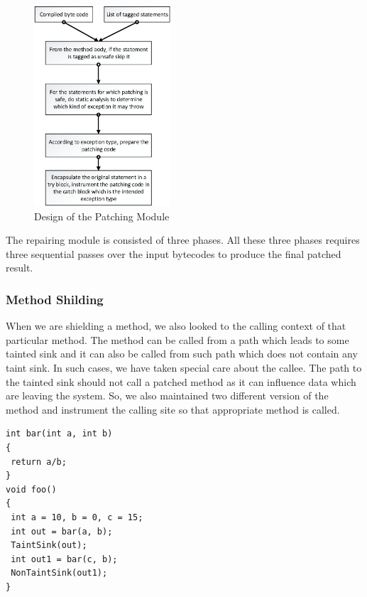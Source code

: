 \begin{figure}
\centering
  \includegraphics[width= 2.0in]{images/PatchModule.png}
  \caption{Design of the Patching Module}
  \label{fig:PatchModule}
\end{figure}

The repairing module is consisted of three phases. All these three phases
requires three sequential passes over the input bytecodes to produce the final
patched result.


\subsubsection{Method Shilding}
\label{MethodShilding}


When we are shielding a method, we also looked to the calling context of that
particular method. The method can be called from a path which leads to some
tainted sink and it can also be called from such path which does not contain
any taint sink. In such cases, we have taken special care about the callee. The
path to the tainted sink should not call a patched method as it can influence
data which are leaving the system. So, we also maintained two different version
of
the method and instrument the calling site so that appropriate method is called.

\lstset{language=Java, caption = Same method calling in different scenario,
label=callingContext}
\begin{lstlisting}
int bar(int a, int b)
{
 return a/b;
}
void foo()
{
 int a = 10, b = 0, c = 15;
 int out = bar(a, b);
 TaintSink(out);
 int out1 = bar(c, b);
 NonTaintSink(out1);
}
\end{lstlisting}


\lstset{language=Java, caption = Mehod name modification for different calling
context, label=callingContextPatch}

